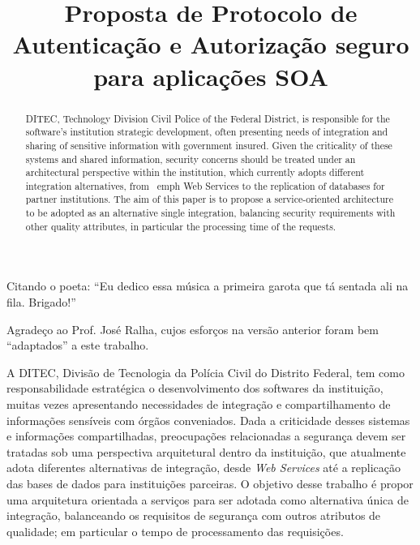 \documentclass[mpca]{unb-cic}
\title{Proposta de Protocolo de Autenticação e Autorização seguro para aplicações SOA}%
\begin{document}
  \maketitle

  \begin{dedicatoria}
Citando o poeta: ``Eu dedico essa música a primeira garota que tá sentada ali na fila. Brigado!''
  \end{dedicatoria}

  \begin{agradecimentos}
Agradeço ao Prof. José Ralha, cujos esforços na versão anterior foram bem ``adaptados'' a este trabalho.
  \end{agradecimentos}


\begin{resumo}
  A DITEC, Divisão de Tecnologia da Polícia Civil do Distrito Federal, tem como responsabilidade estratégica o desenvolvimento dos softwares da instituição, muitas vezes apresentando necessidades de integração e compartilhamento de informações sensíveis com órgãos conveniados. Dada a criticidade desses sistemas e informações compartilhadas, preocupações relacionadas a segurança devem ser tratadas sob uma perspectiva arquitetural dentro da instituição, que atualmente adota diferentes alternativas de integração, desde \emph{Web Services} até a replicação das bases de dados para instituições parceiras. O objetivo desse trabalho é propor uma arquitetura orientada a serviços para ser adotada como alternativa única de integração, balanceando os requisitos de segurança com outros atributos de qualidade; em particular o tempo de processamento das requisições.
\end{resumo}

\begin{abstract}
 DITEC, Technology Division Civil Police of the Federal District, is responsible for the software's institution strategic development, often presenting needs of integration and sharing of sensitive information with government insured. Given the criticality of these systems and shared information, security concerns should be treated under an architectural perspective within the institution, which currently adopts different integration alternatives, from \ emph {Web Services} to the replication of databases for partner institutions. The aim of this paper is to propose a service-oriented architecture to be adopted as an alternative single integration, balancing security requirements with other quality attributes, in particular the processing time of the requests.

\end{abstract}
  \tableofcontents
  \listoffigures
  \listoftables
\end{document}
